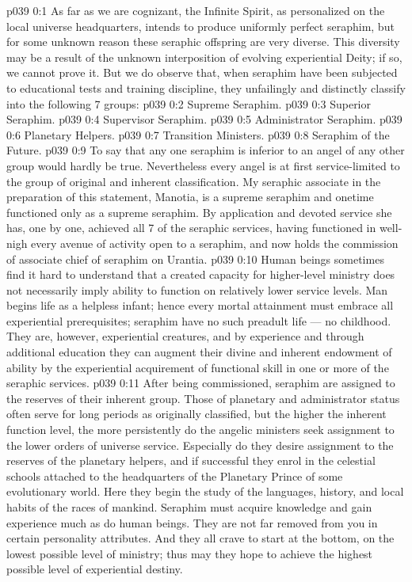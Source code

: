 \author{Melchizedek}
\vs p039 0:1 As far as we are cognizant, the Infinite Spirit, as personalized on the local universe headquarters, intends to produce uniformly perfect seraphim, but for some unknown reason these seraphic offspring are very diverse. This diversity may be a result of the unknown interposition of evolving experiential Deity; if so, we cannot prove it. But we do observe that, when seraphim have been subjected to educational tests and training discipline, they unfailingly and distinctly classify into the following 7 groups:
\vs p039 0:2 \bibnobreakspace Supreme Seraphim.
\vs p039 0:3 \bibnobreakspace Superior Seraphim.
\vs p039 0:4 \bibnobreakspace Supervisor Seraphim.
\vs p039 0:5 \bibnobreakspace Administrator Seraphim.
\vs p039 0:6 \bibnobreakspace Planetary Helpers.
\vs p039 0:7 \bibnobreakspace Transition Ministers.
\vs p039 0:8 \bibnobreakspace Seraphim of the Future.
\vs p039 0:9 \pc To say that any one seraphim is inferior to an angel of any other group would hardly be true. Nevertheless every angel is at first service\hyp{}limited to the group of original and inherent classification. My seraphic associate in the preparation of this statement, Manotia, is a supreme seraphim and onetime functioned only as a supreme seraphim. By application and devoted service she has, one by one, achieved all 7 of the seraphic services, having functioned in well\hyp{}nigh every avenue of activity open to a seraphim, and now holds the commission of associate chief of seraphim on Urantia.
\vs p039 0:10 Human beings sometimes find it hard to understand that a created capacity for higher\hyp{}level ministry does not necessarily imply ability to function on relatively lower service levels. Man begins life as a helpless infant; hence every mortal attainment must embrace all experiential prerequisites; seraphim have no such preadult life --- no childhood. They are, however, experiential creatures, and by experience and through additional education they can augment their divine and inherent endowment of ability by the experiential acquirement of functional skill in one or more of the seraphic services.
\vs p039 0:11 After being commissioned, seraphim are assigned to the reserves of their inherent group. Those of planetary and administrator status often serve for long periods as originally classified, but the higher the inherent function level, the more persistently do the angelic ministers seek assignment to the lower orders of universe service. Especially do they desire assignment to the reserves of the planetary helpers, and if successful they enrol in the celestial schools attached to the headquarters of the Planetary Prince of some evolutionary world. Here they begin the study of the languages, history, and local habits of the races of mankind. Seraphim must acquire knowledge and gain experience much as do human beings. They are not far removed from you in certain personality attributes. And they all crave to start at the bottom, on the lowest possible level of ministry; thus may they hope to achieve the highest possible level of experiential destiny.

